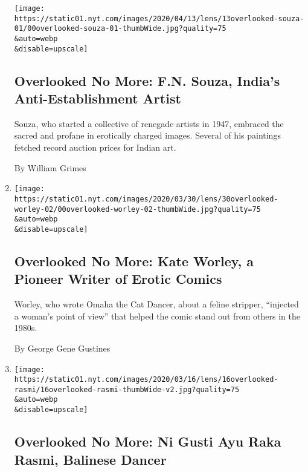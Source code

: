\begin{enumerate}
  \texttt{[image: https://static01.nyt.com/images/2020/04/13/lens/13overlooked-souza-01/00overlooked-souza-01-thumbWide.jpg?quality=75\\\&auto=webp\\\&disable=upscale]}

  \hypertarget{overlooked-no-more-fn-souza-indias-anti-establishment-artist}{%
  \subsection{Overlooked No More: F.N. Souza, India's Anti-Establishment
  Artist}\label{overlooked-no-more-fn-souza-indias-anti-establishment-artist}}

  Souza, who started a collective of renegade artists in 1947, embraced
  the sacred and profane in erotically charged images. Several of his
  paintings fetched record auction prices for Indian art.

  By William Grimes
\item
  \href{/2020/03/27/obituaries/kate-worley-overlooked.html}{}

  \texttt{[image: https://static01.nyt.com/images/2020/03/30/lens/30overlooked-worley-02/00overlooked-worley-02-thumbWide.jpg?quality=75\\\&auto=webp\\\&disable=upscale]}

  \hypertarget{overlooked-no-more-kate-worley-a-pioneer-writer-of-erotic-comics}{%
  \subsection{Overlooked No More: Kate Worley, a Pioneer Writer of
  Erotic
  Comics}\label{overlooked-no-more-kate-worley-a-pioneer-writer-of-erotic-comics}}

  Worley, who wrote Omaha the Cat Dancer, about a feline stripper,
  ``injected a woman's point of view'' that helped the comic stand out
  from others in the 1980s.

  By George Gene Gustines
\item
  \href{/2020/03/13/obituaries/ni-gusti-ayu-raka-rasmi-overlooked.html}{}

  \texttt{[image: https://static01.nyt.com/images/2020/03/16/lens/16overlooked-rasmi/16overlooked-rasmi-thumbWide-v2.jpg?quality=75\\\&auto=webp\\\&disable=upscale]}

  \hypertarget{overlooked-no-more-ni-gusti-ayu-raka-rasmi-balinese-dancer}{%
  \subsection{Overlooked No More: Ni Gusti Ayu Raka Rasmi, Balinese
  Dancer}\label{overlooked-no-more-ni-gusti-ayu-raka-rasmi-balinese-dancer}}


\end{enumerate}
